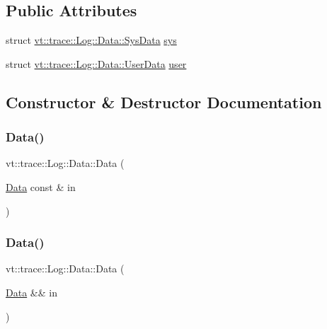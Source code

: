 \subsection*{Public Attributes}
\begin{DoxyCompactItemize}
\item 
struct \hyperlink{structvt_1_1trace_1_1_log_1_1_data_1_1_sys_data}{vt\+::trace\+::\+Log\+::\+Data\+::\+Sys\+Data} \hyperlink{unionvt_1_1trace_1_1_log_1_1_data_a71322b10139cee6014cd6be83c99b3d9}{sys}
\item 
struct \hyperlink{structvt_1_1trace_1_1_log_1_1_data_1_1_user_data}{vt\+::trace\+::\+Log\+::\+Data\+::\+User\+Data} \hyperlink{unionvt_1_1trace_1_1_log_1_1_data_a8d893c0de3ee2fca0852607fa908a2e6}{user}
\end{DoxyCompactItemize}


\subsection{Constructor \& Destructor Documentation}
\mbox{\label{unionvt_1_1trace_1_1_log_1_1_data_aa391f018a8b00d5d9d5083ff3f846fcd}} 
\subsubsection{\texorpdfstring{Data()}{Data()}\hspace{0.1cm}{\footnotesize\ttfamily [1/4]}}
{\footnotesize\ttfamily vt\+::trace\+::\+Log\+::\+Data\+::\+Data (\begin{DoxyParamCaption}\item[{\hyperlink{unionvt_1_1trace_1_1_log_1_1_data}{Data} const \&}]{in }\end{DoxyParamCaption})\hspace{0.3cm}{\ttfamily [inline]}}

\mbox{\label{unionvt_1_1trace_1_1_log_1_1_data_afd6d8af98a0fc51666b55dabe8460d0c}} 
\subsubsection{\texorpdfstring{Data()}{Data()}\hspace{0.1cm}{\footnotesize\ttfamily [2/4]}}
{\footnotesize\ttfamily vt\+::trace\+::\+Log\+::\+Data\+::\+Data (\begin{DoxyParamCaption}\item[{\hyperlink{unionvt_1_1trace_1_1_log_1_1_data}{Data} \&\&}]{in }\end{DoxyParamCaption})\hspace{0.3cm}{\ttfamily [inline]}}

